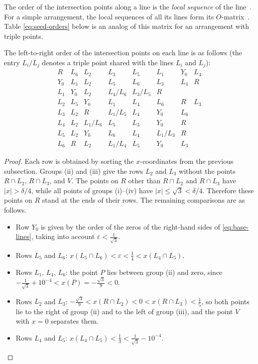 The order of the intersection points along a line is the \emph{local sequence} of the line~\cite{gp84}.
For a simple arrangement, the local sequences of all its lines form its $O$-matrix~\cite[Section~5.1]{pu26b}. Table \eqref{eq:seed-orders} below is an analog of this matrix for an arrangement with triple points.

\begin{lemma}\label{lem:seed-orders}
The left-to-right order of the intersection points on each line is as follows (the entry $L_i/L_j$ denotes a triple point shared with the lines $L_i$ and $L_j$):
\begin{equation}\label{eq:seed-orders}
\begin{array}{c|ccccccc}
R   & L_6 & L_2 & L_3 & L_5 & L_1 & Y_0 & L_4 \\
Y_0 & L_1 & L_2 & L_5 & L_6 & L_3 & L_4 & R \\
L_1 & Y_0 & L_2 & L_4/L_6 & L_3/L_5 & R \\
L_2 & L_5 & Y_0 & L_1 & L_4 & L_6 & R & L_3 \\
L_3 & L_2 & R & L_1/L_5 & L_4 & Y_0 & L_6 \\
L_4 & L_2 & L_1/L_6 & L_5 & L_3 & Y_0 & R \\
L_5 & L_2 & Y_0 & L_6 & L_4 & L_1/L_3 & R \\
L_6 & R & L_2 & L_1/L_4 & L_5 & Y_0 & L_3
\end{array}
\end{equation}
\end{lemma}

\begin{proof}
Each row is obtained by sorting the $x$-coordinates from the previous subsection.
Groups (ii) and (iii) give the rows $L_2$ and $L_3$ without the points $R\cap L_2$, $R\cap L_3$, and $V$.
The points on $R$ other than $R\cap L_2$ and $R\cap L_3$ have $|x|>\delta/4$, while all points of groups (i)--(iv) have $|x|\le\sqrt3<\delta/4$. Therefore these points on $R$ stand at the ends of their rows.
The remaining comparisons are as follows.

\begin{itemize}
\item Row $Y_0$ is given by the order of the zeros of the right-hand sides of \eqref{eq:base-lines}, taking into account $\varepsilon<\tfrac1{\sqrt3}$.
\item Rows $L_5$ and $L_6$: $x(L_5\cap L_6)<\varepsilon<\tfrac14<x(L_4\cap L_5)$.
\item Rows $L_1$, $L_4$, $L_6$: the point $P$ lies between group (ii) and zero, since $-\tfrac1{\sqrt3}+10^{-4}<x(P)=-\tfrac{\sqrt3}9<0$.
\item Rows $L_2$ and $L_3$: $-\tfrac{\sqrt3}9<x(R\cap L_2)<0<x(R\cap L_3)<\tfrac15$, so both points lie to the right of group (ii) and to the left of group (iii), and the point $V$ with $x=0$ separates them.
\item Rows $L_4$ and $L_5$: $x(L_4\cap L_5)<\tfrac13<\tfrac1{\sqrt3}-10^{-4}$.\qedhere
\end{itemize}
\end{proof}

